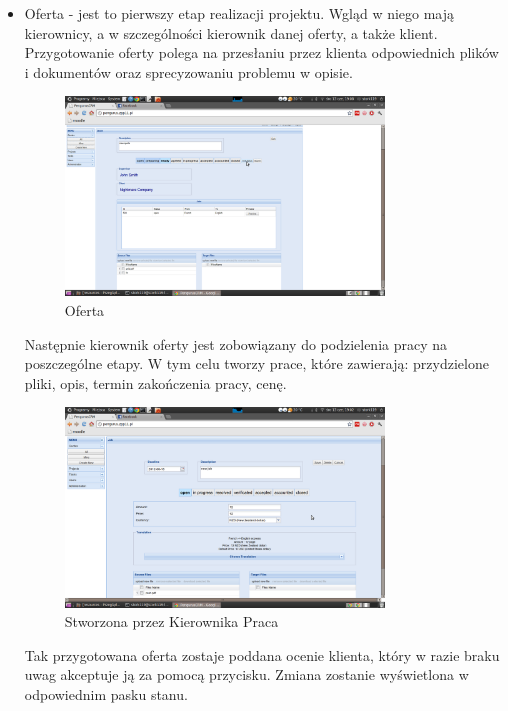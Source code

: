 \documentclass[licencjacka]{pracamgr}
\begin{document}
\begin{itemize}
\item Oferta - jest to pierwszy etap realizacji projektu. Wgląd w niego mają kierownicy, a w szczególności kierownik danej oferty, a także klient.
Przygotowanie oferty polega na przesłaniu przez klienta odpowiednich plików i dokumentów oraz sprecyzowaniu problemu w opisie.

\begin{figure}[ht!]
\centering
\includegraphics[width=0.8\textwidth]{resources/quote.png}
\caption{Oferta}
\end{figure}

Następnie kierownik oferty jest zobowiązany do podzielenia pracy na poszczególne etapy. W tym celu tworzy prace, które zawierają:
przydzielone pliki, opis, termin zakończenia pracy, cenę.

\begin{figure}[ht!]
\centering
\includegraphics[width=0.8\textwidth]{resources/job.png}
\caption{Stworzona przez Kierownika Praca}
\end{figure}

Tak przygotowana oferta zostaje poddana ocenie klienta, który w razie braku uwag akceptuje ją za pomocą przycisku. Zmiana zostanie wyświetlona w odpowiednim pasku stanu.


\end{itemize}
\end{document}
